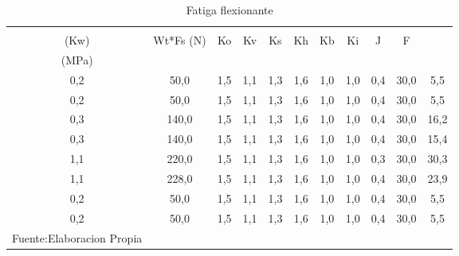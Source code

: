 \begin{longtable}{|c|c|c|c|c|c|c|c|c|c|c|}
\hline
\rowcolor[HTML]{EFEFEF} 
\begin{tabular}[c]{@{}c@{}}Potencia \\ (Kw)\end{tabular} & Wt*Fs (N) & Ko  & Kv  & Ks  & Kh  & Kb  & Ki  & J   & F    & \begin{tabular}[c]{@{}c@{}}Esfuerzo AGMA \\   (MPa)\end{tabular} \\ \hline
0,2                                                      & 50,0      & 1,5 & 1,1 & 1,3 & 1,6 & 1,0 & 1,0 & 0,4 & 30,0 & 5,5                                                              \\ \hline
0,2                                                      & 50,0      & 1,5 & 1,1 & 1,3 & 1,6 & 1,0 & 1,0 & 0,4 & 30,0 & 5,5                                                              \\ \hline
0,3                                                      & 140,0     & 1,5 & 1,1 & 1,3 & 1,6 & 1,0 & 1,0 & 0,4 & 30,0 & 16,2                                                             \\ \hline
0,3                                                      & 140,0     & 1,5 & 1,1 & 1,3 & 1,6 & 1,0 & 1,0 & 0,4 & 30,0 & 15,4                                                             \\ \hline
1,1                                                      & 220,0     & 1,5 & 1,1 & 1,3 & 1,6 & 1,0 & 1,0 & 0,3 & 30,0 & 30,3                                                             \\ \hline
1,1                                                      & 228,0     & 1,5 & 1,1 & 1,3 & 1,6 & 1,0 & 1,0 & 0,4 & 30,0 & 23,9                                                             \\ \hline
0,2                                                      & 50,0      & 1,5 & 1,1 & 1,3 & 1,6 & 1,0 & 1,0 & 0,4 & 30,0 & 5,5                                                              \\ \hline
0,2                                                      & 50,0      & 1,5 & 1,1 & 1,3 & 1,6 & 1,0 & 1,0 & 0,4 & 30,0 & 5,5                                                              \\ \hline
\caption{Fatiga flexionante}{Fuente:Elaboracion Propia}
\label{table:fatiga_flexionante}
\end{longtable}
